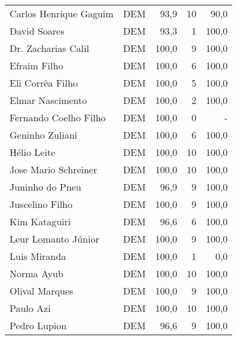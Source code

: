 \begin{longtable}{llrrr}
              Carlos Henrique Gaguim &            DEM &      93,9 &           10 &       90,0 \\
                        David Soares &            DEM &      93,3 &            1 &      100,0 \\
                 Dr. Zacharias Calil &            DEM &     100,0 &            9 &      100,0 \\
                        Efraim Filho &            DEM &     100,0 &            6 &      100,0 \\
                    Eli Corrêa Filho &            DEM &     100,0 &            5 &      100,0 \\
                    Elmar Nascimento &            DEM &     100,0 &            2 &      100,0 \\
               Fernando Coelho Filho &            DEM &     100,0 &            0 &          - \\
                     Geninho Zuliani &            DEM &     100,0 &            6 &      100,0 \\
                         Hélio Leite &            DEM &     100,0 &           10 &      100,0 \\
                Jose Mario Schreiner &            DEM &     100,0 &           10 &      100,0 \\
                     Juninho do Pneu &            DEM &      96,9 &            9 &      100,0 \\
                     Juscelino Filho &            DEM &     100,0 &            9 &      100,0 \\
                       Kim Kataguiri &            DEM &      96,6 &            6 &      100,0 \\
                 Leur Lomanto Júnior &            DEM &     100,0 &            9 &      100,0 \\
                        Luis Miranda &            DEM &     100,0 &            1 &        0,0 \\
                          Norma Ayub &            DEM &     100,0 &           10 &      100,0 \\
                      Olival Marques &            DEM &     100,0 &            9 &      100,0 \\
                           Paulo Azi &            DEM &     100,0 &           10 &      100,0 \\
                        Pedro Lupion &            DEM &      96,6 &            9 &      100,0 \\

\end{longtable}
